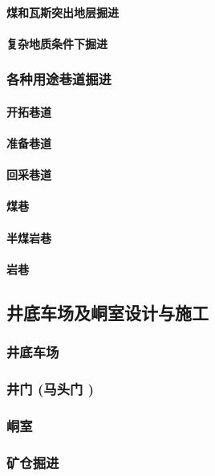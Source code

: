 \documentclass[UTF8]{../../ApplicationUniverse}
\begin{document}
            \paragraph{煤和瓦斯突出地层掘进}
            \paragraph{复杂地质条件下掘进}
        \subsubsection{各种用途巷道掘进}
            \paragraph{开拓巷道}
            \paragraph{准备巷道}
            \paragraph{回采巷道}
            \paragraph{煤巷}
            \paragraph{半煤岩巷}
            \paragraph{岩巷}
    \subsection{井底车场及峒室设计与施工}
        \subsubsection{井底车场}
        \subsubsection{井门 (马头门 )}
        \subsubsection{峒室}
        \subsubsection{矿仓掘进}
\end{document}
